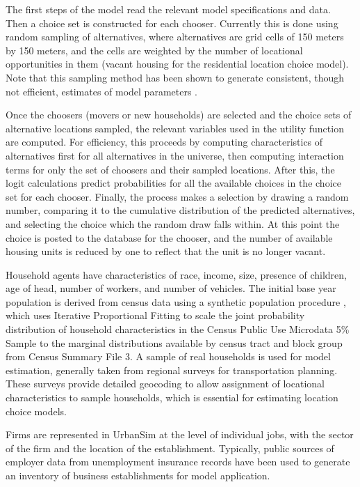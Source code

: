 \documentclass[12pt,a4paper]{article}
\begin{document}
The first steps of the model read the relevant model
specifications and data.  Then a choice set is constructed for
each chooser.  Currently this is done using random sampling of
alternatives, where alternatives are grid cells of 150 meters by
150 meters, and the cells are weighted by the number of locational
opportunities in them (vacant housing for the residential location
choice model).  Note that this sampling method has been shown to
generate consistent, though not efficient, estimates of model
parameters \cite{ben-akiva-lerman-1987}.

Once the choosers (movers or new households) are selected and the
choice sets of alternative locations sampled, the relevant
variables used in the utility function are computed.  For
efficiency, this proceeds by computing characteristics of
alternatives first for all alternatives in the universe, then
computing interaction terms for only the set of choosers and their
sampled locations.  After this, the logit calculations predict
probabilities for all the available choices in the choice set for
each chooser.  Finally, the process makes a selection by drawing a
random number, comparing it to the cumulative distribution of the
predicted alternatives, and selecting the choice which the random
draw falls within.  At this point the choice is posted to the
database for the chooser, and the number of available housing
units is reduced by one to reflect that the unit is no longer
vacant.

Household agents have characteristics of race, income, size,
presence of children, age of head, number of workers, and number
of vehicles. The initial base year population is derived from
census data using a synthetic population procedure
\cite{beckman-1995}, which uses Iterative Proportional Fitting to
scale the joint probability distribution of household
characteristics in the Census Public Use Microdata 5\% Sample to
the marginal distributions available by census tract and block
group from Census Summary File 3. A sample of real households is
used for model estimation, generally taken from regional surveys
for transportation planning.  These surveys provide detailed
geocoding to allow assignment of locational characteristics to
sample households, which is essential for estimating location
choice models.

Firms are represented in UrbanSim at the level of individual jobs,
with the sector of the firm and the location of the establishment.
Typically, public sources of employer data from unemployment
insurance records have been used to generate an inventory of
business establishments for model application.
\end{document}
